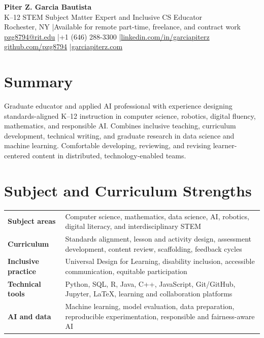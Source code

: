 \documentclass[10pt,letterpaper]{article}
\begin{document}
\fontsize{9}{10.5}\selectfont

\begin{center}
  {\Large\bfseries Piter Z. Garcia Bautista}\\[1pt]
  {\large K--12 STEM Subject Matter Expert and Inclusive CS Educator}\\[2pt]
  Rochester, NY \enspace|\enspace Available for remote part-time, freelance, and contract work\\
  \href{mailto:pzg8794@rit.edu}{pzg8794@rit.edu}
  \enspace|\enspace +1 (646) 288-3300
  \enspace|\enspace \href{https://linkedin.com/in/garciapiterz}{linkedin.com/in/garciapiterz}\\
  \href{https://github.com/pzg8794}{github.com/pzg8794}
  \enspace|\enspace \href{https://garciapiterz.com}{garciapiterz.com}
\end{center}

\section*{Summary}
Graduate educator and applied AI professional with experience designing
standards-aligned K--12 instruction in computer science, robotics, digital
fluency, mathematics, and responsible AI. Combines inclusive teaching,
curriculum development, technical writing, and graduate research in data
science and machine learning. Comfortable developing, reviewing, and revising
learner-centered content in distributed, technology-enabled teams.

\section*{Subject and Curriculum Strengths}
\begin{tabularx}{\textwidth}{@{}>{\bfseries}l X@{}}
Subject areas & Computer science, mathematics, data science, AI, robotics, digital literacy, and interdisciplinary STEM\\
Curriculum & Standards alignment, lesson and activity design, assessment development, content review, scaffolding, feedback cycles\\
Inclusive practice & Universal Design for Learning, disability inclusion, accessible communication, equitable participation\\
Technical tools & Python, SQL, R, Java, C++, JavaScript, Git/GitHub, Jupyter, LaTeX, learning and collaboration platforms\\
AI and data & Machine learning, model evaluation, data preparation, reproducible experimentation, responsible and fairness-aware AI\\
\end{tabularx}
\end{document}
